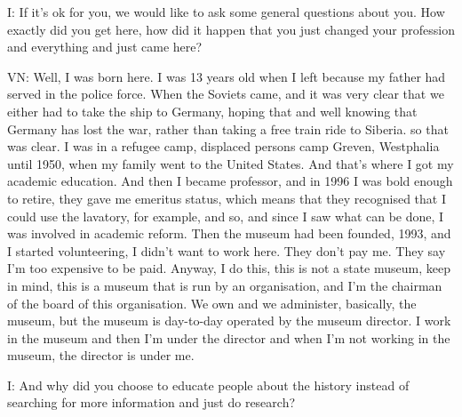 I: If it's ok for you, we would like to ask some general questions about you. How exactly did you get here, how did it happen that you just changed your profession and everything and just came here?

VN: Well, I was born here. I was 13 years old when I left because my father had served in the police force. When the Soviets came, and it was very clear that we either had to take the ship to Germany, hoping that and well knowing that Germany has lost the war, rather than taking a free train ride to Siberia. so that was clear. I was in a refugee camp, displaced persons camp Greven, Westphalia until 1950, when my family went to the United States. And that's where I got my academic education. And then I became professor, and in 1996 I was bold enough to retire, they gave me emeritus status, which means that they recognised that I could use the lavatory, for example, and so, and since I saw what can be done, I was involved in academic reform. Then the museum had been founded, 1993, and I started volunteering, I didn't want to work here. They don't pay me. 
They say I’m too expensive to be paid. Anyway, I do this, this is not a state museum, keep in mind, this is a museum that is run by an organisation, and I'm the chairman of the board of this organisation. We own and we administer, basically, the museum, but the museum is day-to-day operated by the museum director. I work in the museum and then I'm under the director and when I'm not working in the museum, the director is under me.

I: And why did you choose to educate people about the history instead of searching for more information and just do research?


